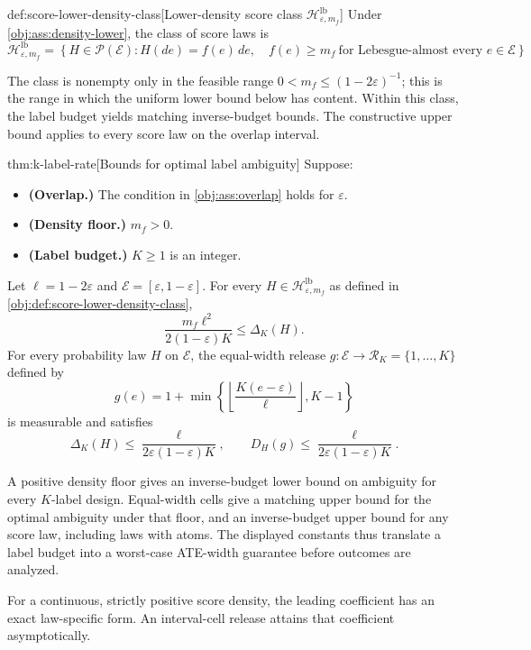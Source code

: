 \begin{definitionv}{def:score-lower-density-class}[Lower-density score class $\mathcal H^{\mathrm{lb}}_{\varepsilon,m_f}$]
Under \cref{obj:ass:density-lower}, the class of score laws is
\[
\mathcal H^{\mathrm{lb}}_{\varepsilon,m_f}
=
\left\{
H\in\mathcal P(\mathcal E):
H(de)=f(e)\,de,\quad
f(e)\ge m_f\ \text{for Lebesgue-almost every }e\in\mathcal E
\right\}.
\]
\end{definitionv}

The class is nonempty only in the feasible range \(0<m_f\le (1-2\varepsilon)^{-1}\); this is the range in which the uniform lower bound below has content. Within this class, the label budget yields matching inverse-budget bounds. The constructive upper bound applies to every score law on the overlap interval.

\begin{theoremv}{thm:k-label-rate}[Bounds for optimal label ambiguity]
Suppose:
\begin{itemize}
\item \textbf{(Overlap.)} The condition in \cref{obj:ass:overlap} holds for \(\varepsilon\).
\item \textbf{(Density floor.)} \(m_f>0\).
\item \textbf{(Label budget.)} \(K\geq 1\) is an integer.
\end{itemize}
Let \(\ell=1-2\varepsilon\) and \(\mathcal E=[\varepsilon,1-\varepsilon]\). For every \(H\in\mathcal H^{\mathrm{lb}}_{\varepsilon,m_f}\) as defined in \cref{obj:def:score-lower-density-class},
\[
\frac{m_f\ell^2}{2(1-\varepsilon)K}\leq\Delta_K(H).
\]
For every probability law \(H\) on \(\mathcal E\), the equal-width release \(g:\mathcal E\to\mathcal R_K=\{1,\ldots,K\}\) defined by
\[
g(e)=1+\min\left\{\left\lfloor\frac{K(e-\varepsilon)}{\ell}\right\rfloor,K-1\right\}
\]
is measurable and satisfies
\[
\Delta_K(H)\leq\frac{\ell}{2\varepsilon(1-\varepsilon)K},
\qquad
D_H(g)\leq\frac{\ell}{2\varepsilon(1-\varepsilon)K}.
\]
\end{theoremv}

A positive density floor gives an inverse-budget lower bound on ambiguity for every \(K\)-label design. Equal-width cells give a matching upper bound for the optimal ambiguity under that floor, and an inverse-budget upper bound for any score law, including laws with atoms. The displayed constants thus translate a label budget into a worst-case ATE-width guarantee before outcomes are analyzed.

For a continuous, strictly positive score density, the leading coefficient has an exact law-specific form. An interval-cell release attains that coefficient asymptotically.

